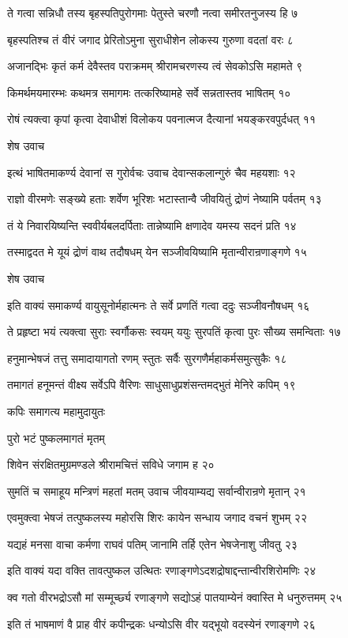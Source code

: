 ते गत्वा सन्निधौ तस्य बृहस्पतिपुरोगमाः
पेतुस्ते चरणौ नत्वा समीरतनुजस्य हि ७

बृहस्पतिश्च तं वीरं जगाद प्रेरितोऽमुना
सुराधीशेन लोकस्य गुरुणा वदतां वरः ८

अजानद्भिः कृतं कर्म देवैस्तव पराक्रमम्
श्रीरामचरणस्य त्वं सेवकोऽसि महामते ९

किमर्थमयमारम्भः कथमत्र समागमः
तत्करिष्यामहे सर्वे सन्नतास्तव भाषितम् १०

रोषं त्यक्त्वा कृपां कृत्वा देवाधीशं विलोकय
पवनात्मज दैत्यानां भयङ्करवपुर्दधत् ११

शेष उवाच

इत्थं भाषितमाकर्ण्य देवानां स गुरोर्वचः
उवाच देवान्सकलान्गुरुं चैव महयशाः १२

राज्ञो वीरमणेः सङ्ख्ये हताः शर्वेण भूरिशः
भटास्तान्वै जीवयितुं द्रोणं नेष्यामि पर्वतम् १३

तं ये निवारयिष्यन्ति स्ववीर्यबलदर्पिताः
तान्नेष्यामि क्षणादेव यमस्य सदनं प्रति १४

तस्माद्वदत मे यूयं द्रोणं वाथ तदौषधम्
येन सञ्जीवयिष्यामि मृतान्वीरान्रणाङ्गणे १५

शेष उवाच

इति वाक्यं समाकर्ण्य वायुसूनोर्महात्मनः
ते सर्वे प्रणतिं गत्वा ददुः सञ्जीवनौषधम् १६

ते प्रहृष्टा भयं त्यक्त्वा सुराः स्वर्गौकसः स्वयम्
ययुः सुरपतिं कृत्वा पुरः सौख्य समन्विताः १७

हनुमान्भेषजं तत्तु समादायागतो रणम्
स्तुतः सर्वैः सुरगणैर्महाकर्मसमुत्सुकैः १८

तमागतं हनूमन्तं वीक्ष्य सर्वेऽपि वैरिणः
साधुसाधुप्रशंसन्तमद्भुतं मेनिरे कपिम् १९

कपिः समागत्य महामुदायुतः

पुरो भटं पुष्कलमागतं मृतम्

शिवेन संरक्षितमुग्रमण्डले
श्रीरामचित्तं सविधे जगाम ह २०

सुमतिं च समाहूय मन्त्रिणं महतां मतम्
उवाच जीवयाम्यद्य सर्वान्वीरान्रणे मृतान् २१

एवमुक्त्वा भेषजं तत्पुष्कलस्य महोरसि
शिरः कायेन सन्धाय जगाद वचनं शुभम् २२

यद्यहं मनसा वाचा कर्मणा राघवं पतिम्
जानामि तर्हि एतेन भेषजेनाशु जीवतु २३

इति वाक्यं यदा वक्ति तावत्पुष्कल उत्थितः
रणाङ्गणेऽदशद्रोषाद्दन्तान्वीरशिरोमणिः २४

क्व गतो वीरभद्रोऽसौ मां सम्मूर्च्छ्य रणाङ्गणे
सद्योऽहं पातयाम्येनं क्वास्ति मे धनुरुत्तमम् २५

इति तं भाषमाणं वै प्राह वीरं कपीन्द्रकः
धन्योऽसि वीर यद्भूयो वदस्येनं रणाङ्गणे २६

